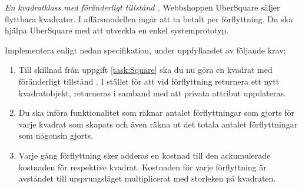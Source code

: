 \Task \emph{En kvadratklass med föränderligt tillstånd .} Webbshoppen UberSquare säljer flyttbara kvadrater. I affärsmodellen ingår att ta betalt per förflyttning. Du ska hjälpa UberSquare med att utveckla en enkel systemprototyp. 

\Subtask Implementera  enligt nedan specifikation, under uppfyllandet av följande krav:

\begin{enumerate}
\item Till skillnad från uppgift \ref{task:Square} ska du nu göra en kvadrat med föränderligt tillstånd . I stället för att vid förflyttning returnera ett nytt kvadratobjekt, returneras  i samband med att privata attribut uppdateras.
\item Du ska införa funktionalitet som räknar antalet förflyttningar som gjorts för varje kvadrat som skapats och även räkna ut det totala antalet förflyttningar som någonsin gjorts.
\item Varje gång förflyttning sker adderas en kostnad till den ackumulerade kostnaden för respektive kvadrat. Kostnaden för varje förflyttning är avståndet till ursprungsläget multiplicerat med storleken på kvadraten.
\end{enumerate}

